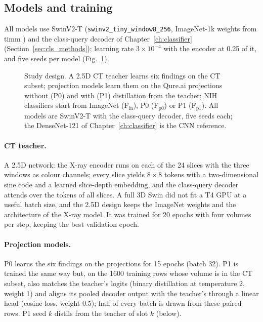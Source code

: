 \subsection{Models and training}
\label{sec:xm_models}
All models use SwinV2-T (\texttt{swinv2\_tiny\_window8\_256}, ImageNet-1k weights from timm \citep{wightman2019timm}) and the class-query
decoder of Chapter~\ref{ch:classifier} (Section~\ref{sec:cls_methods}); learning rate $3\times10^{-4}$ with the encoder at 0.25 of it, and
five seeds per model (Fig.~\ref{fig:xm_design}).

\begin{figure}[htbp]
\centering
{}
\caption{Study design. A 2.5D CT teacher learns six findings on the CT subset; projection models learn them on the Qure.ai projections
without (P0) and with (P1) distillation from the teacher; NIH classifiers start from ImageNet (F$_\mathrm{in}$), P0 (F$_\mathrm{p0}$) or P1
(F$_\mathrm{p1}$). All models are SwinV2-T with the class-query decoder, five seeds each; the DenseNet-121 of
Chapter~\ref{ch:classifier} is the CNN reference.}
\label{fig:xm_design}
\end{figure}

\paragraph{CT teacher.} A 2.5D network: the X-ray encoder runs on each of the 24 slices with the three windows as colour channels; every
slice yields $8\times8$ tokens with a two-dimensional sine code and a learned slice-depth embedding, and the class-query decoder attends
over the tokens of all slices. A full 3D Swin did not fit a T4 GPU at a useful batch size, and the 2.5D design keeps the ImageNet weights
and the architecture of the X-ray model. It was trained for 20 epochs with four volumes per step, keeping the best validation epoch.

\paragraph{Projection models.} P0 learns the six findings on the projections for 15 epochs (batch 32). P1 is trained the same way but,
on the \num{1600} training rows whose volume is in the CT subset, also matches the teacher's logits (binary distillation at temperature
2, weight 1) and aligns its pooled decoder output with the teacher's through a linear head (cosine loss, weight 0.5); half of every batch
is drawn from these paired rows. P1 seed $k$ distils from the teacher of slot $k$ (below).

